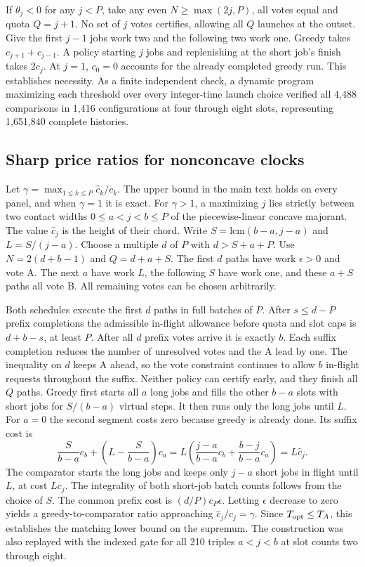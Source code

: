 If $\theta_j<0$ for any $j<P$, take any even $N\ge\max(2j,P)$, all votes equal and quota $Q=j+1$. No set of $j$ votes certifies, allowing all $Q$ launches at the outset. Give the first $j-1$ jobs work two and the following two work one. Greedy takes $c_{j+1}+c_{j-1}$. A policy starting $j$ jobs and replenishing at the short job's finish takes $2c_j$. At $j=1$, $c_0=0$ accounts for the already completed greedy run. This establishes necessity. As a finite independent check, a dynamic program maximizing each threshold over every integer-time launch choice verified all 4,488 comparisons in 1,416 configurations at four through eight slots, representing 1,651,840 complete histories.

\subsection{Sharp price ratios for nonconcave clocks}\label{app:sharp}
Let $\gamma=\max_{1\le k\le P}\widehat c_k/c_k$. The upper bound in the main text holds on every panel, and when $\gamma=1$ it is exact. For $\gamma>1$, a maximizing $j$ lies strictly between two contact widths $0\le a<j<b\le P$ of the piecewise-linear concave majorant. The value $\widehat c_j$ is the height of their chord. Write $S=\mathrm{lcm}(b-a,j-a)$ and $L=S/(j-a)$. Choose a multiple $d$ of $P$ with $d>S+a+P$. Use $N=2(d+b-1)$ and $Q=d+a+S$. The first $d$ paths have work $\epsilon>0$ and vote A. The next $a$ have work $L$, the following $S$ have work one, and these $a+S$ paths all vote B. All remaining votes can be chosen arbitrarily.

Both schedules execute the first $d$ paths in full batches of $P$. After $s\le d-P$ prefix completions the admissible in-flight allowance before quota and slot caps is $d+b-s$, at least $P$. After all $d$ prefix votes arrive it is exactly $b$. Each suffix completion reduces the number of unresolved votes and the A lead by one. The inequality on $d$ keeps A ahead, so the vote constraint continues to allow $b$ in-flight requests throughout the suffix. Neither policy can certify early, and they finish all $Q$ paths. Greedy first starts all $a$ long jobs and fills the other $b-a$ slots with short jobs for $S/(b-a)$ virtual steps. It then runs only the long jobs until $L$. For $a=0$ the second segment costs zero because greedy is already done. Its suffix cost is
\[
 \frac{S}{b-a}c_b+\left(L-\frac{S}{b-a}\right)c_a
 = L\left(\frac{j-a}{b-a}c_b+\frac{b-j}{b-a}c_a\right)=L\widehat c_j .
\]
The comparator starts the long jobs and keeps only $j-a$ short jobs in flight until $L$, at cost $Lc_j$. The integrality of both short-job batch counts follows from the choice of $S$. The common prefix cost is $(d/P)c_P\epsilon$. Letting $\epsilon$ decrease to zero yields a greedy-to-comparator ratio approaching $\widehat c_j/c_j=\gamma$. Since $T_{\rm opt}\le T_A$, this establishes the matching lower bound on the supremum. The construction was also replayed with the indexed gate for all 210 triples $a<j<b$ at slot counts two through eight.


